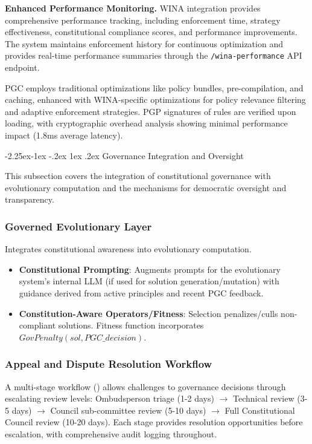 \documentclass[manuscript,screen,review,anonymous,9pt]{acmart}
\makeatletter
\renewcommand\subsection{\@startsection{subsection}{2}{\z@}%
  {-2.25ex\@plus -1ex \@minus -.2ex}%
  {1ex \@plus .2ex}%
  {\normalfont\large\bfseries}}
\makeatother
\begin{document}
\textbf{Enhanced Performance Monitoring.} WINA integration provides comprehensive performance tracking, including enforcement time, strategy effectiveness, constitutional compliance scores, and performance improvements. The system maintains enforcement history for continuous optimization and provides real-time performance summaries through the \texttt{/wina-performance} API endpoint.

PGC employs traditional optimizations like policy bundles, pre-compilation, and caching, enhanced with WINA-specific optimizations for policy relevance filtering and adaptive enforcement strategies. PGP signatures of rules are verified upon loading, with cryptographic overhead analysis showing minimal performance impact (1.8ms average latency).

\subsection{Governance Integration and Oversight}
\label{subsec:governance_integration}

This subsection covers the integration of constitutional governance with evolutionary computation and the mechanisms for democratic oversight and transparency.

\subsubsection{Governed Evolutionary Layer}
Integrates constitutional awareness into evolutionary computation.
\begin{itemize}
	\item \textbf{Constitutional Prompting}: Augments prompts for the evolutionary system's internal LLM (if used for solution generation/mutation) with guidance derived from active principles and recent PGC feedback.
	\item \textbf{Constitution-Aware Operators/Fitness}: Selection penalizes/culls non-compliant solutions. Fitness function incorporates $GovPenalty(sol, PGC\_decision)$.
\end{itemize}

\subsubsection{Appeal and Dispute Resolution Workflow}
A multi-stage workflow () allows challenges to governance decisions through escalating review levels: Ombudsperson triage (1-2 days) $\rightarrow$ Technical review (3-5 days) $\rightarrow$ Council sub-committee review (5-10 days) $\rightarrow$ Full Constitutional Council review (10-20 days). Each stage provides resolution opportunities before escalation, with comprehensive audit logging throughout.
\end{document}
